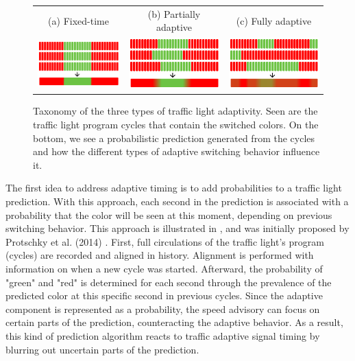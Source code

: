 \begin{figure}[t]
\centering 
\begin{tabular}{ccc}
\footnotesize{(a) Fixed-time} & \footnotesize{(b) Partially adaptive} & \footnotesize{(c) Fully adaptive} \\
\includegraphics[width=0.3\linewidth]{images/explanation-fixed-time.png} & \includegraphics[width=0.3\linewidth]{images/explanation-partially-adaptive.png} & \includegraphics[width=0.3\linewidth]{images/explanation-fully-adaptive.png}
\end{tabular}
\caption{Taxonomy of the three types of traffic light adaptivity. Seen are the traffic light program cycles that contain the switched colors. On the bottom, we see a probabilistic prediction generated from the cycles and how the different types of adaptive switching behavior influence it.}
\label{fig:prediction}
\end{figure}

The first idea to address adaptive timing is to add probabilities to a traffic light prediction. With this approach, each second in the prediction is associated with a probability that the color will be seen at this moment, depending on previous switching behavior. This approach is illustrated in , and was initially proposed by Protschky et al. (2014) \cite{protschky_extensive_2014, protschky_adaptive_2014}. First, full circulations of the traffic light's program (cycles) are recorded and aligned in history. Alignment is performed with information on when a new cycle was started. Afterward, the probability of "green" and "red" is determined for each second through the prevalence of the predicted color at this specific second in previous cycles. Since the adaptive component is represented as a probability, the speed advisory can focus on certain parts of the prediction, counteracting the adaptive behavior. As a result, this kind of prediction algorithm reacts to traffic adaptive signal timing by blurring out uncertain parts of the prediction. 

